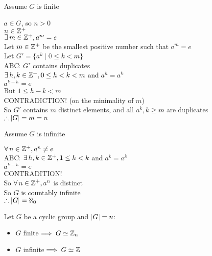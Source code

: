 \documentclass[letterpaper,12pt,fleqn]{article}
\begin{document}
\begin{theproof}
  \listbreak
  \begin{description}
  \item Assume $G$ is finite

    $a\in G$, so $n>0$ \\
    $n\in\mathbb{Z}^+$ \\
    $\exists\,m\in\mathbb{Z}^+,a^m=e$ \\
    Let $m\in\mathbb{Z}^+$ be the smallest positive number such that $a^m=e$ \\
    Let $G'=\{a^k\mid 0\le k<m\}$ \\
    ABC: $G'$ contains duplicates \\
    $\exists\,h,k\in\mathbb{Z}^+,0\le h<k<m$ and $a^h=a^k$ \\
    $a^{k-h}=e$ \\
    But $1\le h-k<m$ \\
    CONTRADICTION! (on the minimality of $m$) \\
    So $G'$ contains $m$ distinct elements, and all $a^k,k\ge m$ are
    duplicates \\
    $\therefore \lvert G\rvert=m=n$

  \item Assume $G$ is infinite

    $\forall\,n\in\mathbb{Z}^+,a^n\ne e$ \\
    ABC: $\exists\,h,k\in\mathbb{Z}^+,1\le h<k$ and $a^k=a^k$ \\
    $a^{k-h}=e$ \\
    CONTRADITION! \\
    So $\forall\,n\in\mathbb{Z}^+,a^n$ is distinct \\
    So $G$ is countably infinite \\
    $\therefore \lvert G\rvert=\aleph_0$
  \end{description}
\end{theproof}

\begin{theorem}
  Let $G$ be a cyclic group and $\lvert G\rvert=n$:
  \begin{itemize}
  \item $G$ finite$\implies G\simeq\mathbb{Z}_n$
  \item $G$ infinite$\implies G\simeq\mathbb{Z}$
  \end{itemize}
\end{theorem}
\end{document}
